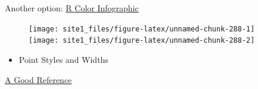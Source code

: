 \documentclass[]{book}
\newenvironment{Shaded}{\begin{snugshade}}{\end{snugshade}}
\newcommand{\CommentTok}[1]{\textcolor[rgb]{0.56,0.35,0.01}{\textit{#1}}}
\newcommand{\DataTypeTok}[1]{\textcolor[rgb]{0.13,0.29,0.53}{#1}}
\newcommand{\DecValTok}[1]{\textcolor[rgb]{0.00,0.00,0.81}{#1}}
\newcommand{\KeywordTok}[1]{\textcolor[rgb]{0.13,0.29,0.53}{\textbf{#1}}}
\newcommand{\NormalTok}[1]{#1}
\newcommand{\OperatorTok}[1]{\textcolor[rgb]{0.81,0.36,0.00}{\textbf{#1}}}
\newcommand{\StringTok}[1]{\textcolor[rgb]{0.31,0.60,0.02}{#1}}
\providecommand{\tightlist}{%
  \setlength{\itemsep}{0pt}\setlength{\parskip}{0pt}}
\begin{document}
Another option: \href{http://research.stowers-institute.org/efg/R/Color/Chart/ColorsChart1.jpg}{R Color Infographic}

\begin{Shaded}
\end{Shaded}

\begin{figure}

{\centering \texttt{[image: site1\_files/figure-latex/unnamed-chunk-288-1]} \texttt{[image: site1\_files/figure-latex/unnamed-chunk-288-2]} 

}

\caption{ }\label{fig:unnamed-chunk-288}
\end{figure}

\begin{itemize}
\tightlist
\item
  Point Styles and Widths
\end{itemize}

\href{http://www.endmemo.com/program/R/pic/pchsymbols.png}{A Good Reference}
\end{document}
